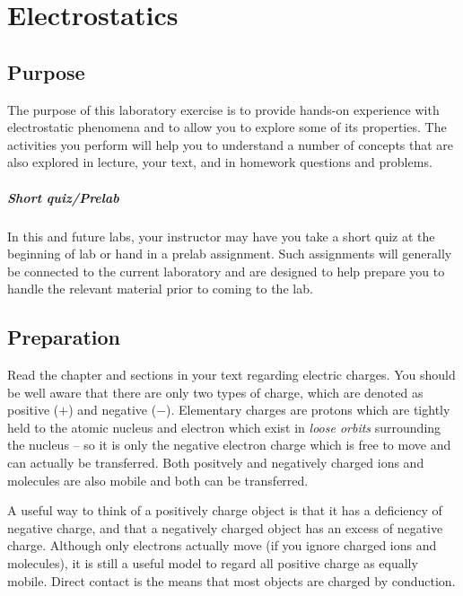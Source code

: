 
\chapter{Electrostatics}
\begin{multicols}{2}
\section{Purpose}
The purpose of this laboratory exercise is to provide hands-on experience with electrostatic phenomena and to allow you to explore some of its properties.  The activities you perform will help you to understand a number of concepts that are also explored in lecture, your text, and in homework questions and problems.
\paragraph{Short quiz/Prelab}
  In this and future labs, your instructor may have you take a short quiz at the beginning of lab or hand in a prelab assignment.  Such assignments  will generally be connected to the current laboratory and are designed to help prepare you to handle the relevant material prior to coming to the lab.
\section{Preparation}
Read the chapter and sections in your text regarding electric charges. You should be well aware that there are only two types of charge, which are denoted as positive ($+$) and negative ($-$). Elementary charges are protons which are tightly held to the atomic nucleus and electron which exist in \emph{loose orbits} surrounding the nucleus -- so it is only the negative electron charge which is free to move and can actually be transferred. Both positvely and negatively charged ions and molecules are also mobile and both can be transferred. 

A useful way to think of a positively charge object is that it has a deficiency of negative charge, and that a negatively charged object has an excess of negative charge. Although only electrons actually move (if you ignore charged ions and molecules), it is still a useful model to regard all positive charge as equally mobile. Direct contact is the means that most objects are charged by conduction.


\end{multicols}
